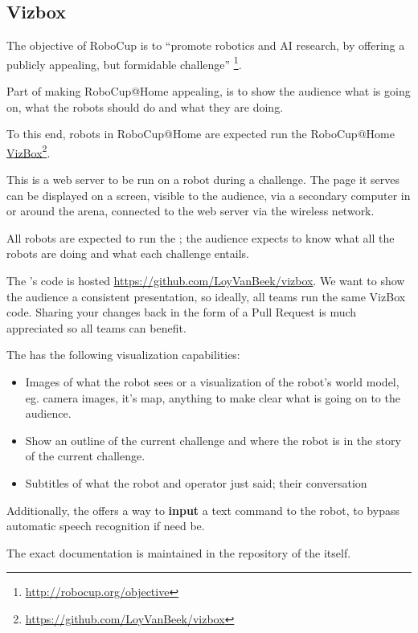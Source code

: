 \subsection{Vizbox}
\label{vizbox}

The objective of RoboCup is to \enquote{promote robotics and AI research, by offering a publicly appealing, but formidable challenge} \footnote{\url{http://robocup.org/objective}}.

Part of making RoboCup@Home appealing, is to show the audience what is going on, what the robots should do and what they are doing.

To this end, robots in RoboCup@Home are expected run the RoboCup@Home \href{https://github.com/LoyVanBeek/vizbox}{VizBox}\footnote{\url{https://github.com/LoyVanBeek/vizbox}}.

This is a web server to be run on a robot during a challenge. The page it serves can be displayed on a screen, visible to the audience, via a secondary computer in or around the arena, connected to the web server via the wireless network.

All robots are expected to run the ; the audience expects to know what all the robots are doing and what each challenge entails.

The 's code is hosted \url{https://github.com/LoyVanBeek/vizbox}.
We want to show the audience a consistent presentation, so ideally, all teams run the same VizBox code.
Sharing your changes back in the form of a Pull Request is much appreciated so all teams can benefit.

The  has the following visualization capabilities:
\begin{itemize}
	\item Images of what the robot sees or a visualization of the robot's world model, eg. camera images, it's map, anything to make clear what is going on to the audience.
	\item Show an outline of the current challenge and where the robot is in the story of the current challenge.
	\item Subtitles of what the robot and operator just said; their conversation
\end{itemize}

Additionally, the  offers a way to \textbf{input} a text command to the robot, to bypass automatic speech recognition if need be.

The exact documentation is maintained in the repository of the  itself.